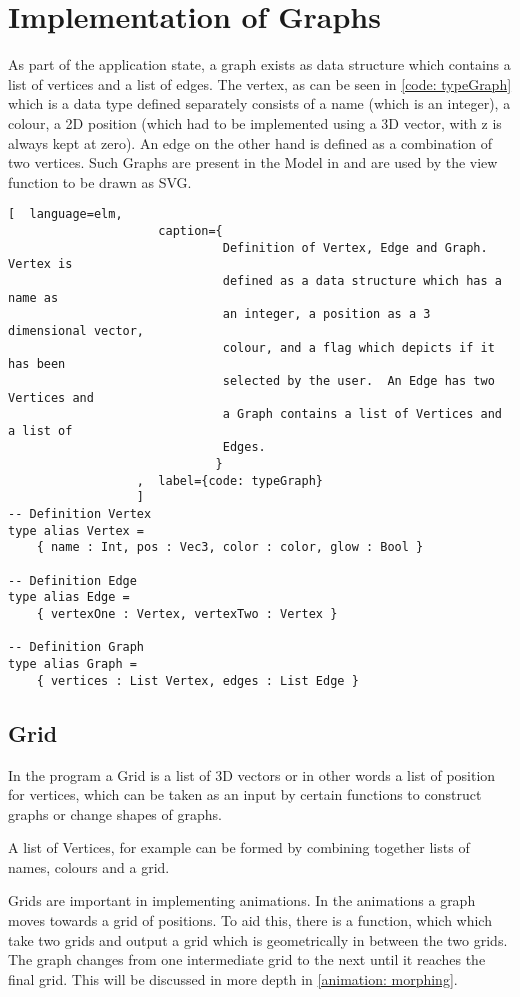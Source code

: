\section{Implementation of Graphs}
As part of the application state, a graph exists as data structure which contains a list of
vertices and a list of edges. The vertex, as can be seen in \autoref{code:
typeGraph} which is a data type defined separately consists of a name (which is
an integer), a colour, a 2D position (which had to be implemented using a 3D
vector, with z is always kept at zero).  An edge on the other hand is defined
as a combination of two vertices. Such Graphs are present in the Model in and
are used by the view function to be drawn as SVG.

\begin{lstlisting}[  language=elm, 
                     caption={
                              Definition of Vertex, Edge and Graph.  Vertex is
                              defined as a data structure which has a name as
                              an integer, a position as a 3 dimensional vector,
                              colour, and a flag which depicts if it has been
                              selected by the user.  An Edge has two Vertices and
                              a Graph contains a list of Vertices and a list of
                              Edges.
                             }
                  ,  label={code: typeGraph}
                  ]
-- Definition Vertex
type alias Vertex =
    { name : Int, pos : Vec3, color : color, glow : Bool }

-- Definition Edge
type alias Edge =
    { vertexOne : Vertex, vertexTwo : Vertex }

-- Definition Graph
type alias Graph =
    { vertices : List Vertex, edges : List Edge }
\end{lstlisting}

\subsection{Grid}
In the program a Grid is a list of 3D vectors or in other words a list of
position for vertices, which can be taken as an input by certain functions to
construct graphs or change shapes of graphs. 

A list of Vertices, for example can be formed by combining together lists of
names, colours and a grid.

Grids are important in implementing animations. In the animations a graph moves
towards a grid of positions. To aid this, there is a function, which which take
two grids and output a grid which is geometrically in between the two grids.
The graph changes from one intermediate grid to the next until it
reaches the final grid. This will be discussed in more depth in \autoref{animation:
morphing}.


